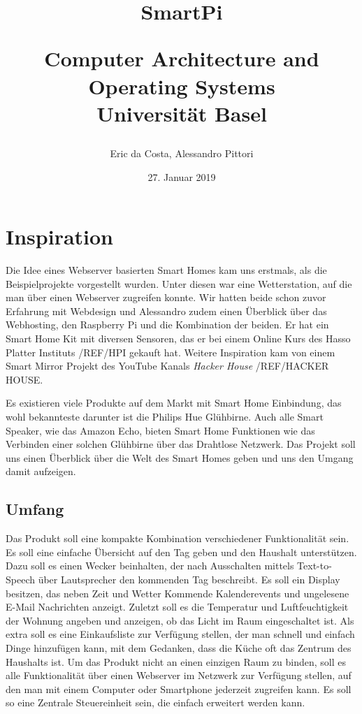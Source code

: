 \documentclass[11pt,a4paper]{article}
\title{SmartPi\\ \begin{large} Computer Architecture and Operating Systems\\ Universität Basel\end{large}}
\author{Eric da Costa, Alessandro Pittori}
\date{27. Januar 2019}
\begin{document}
\maketitle

\newpage

\section{Inspiration}
Die Idee eines Webserver basierten Smart Homes kam uns erstmals, als die Beispielprojekte vorgestellt wurden. Unter diesen war eine Wetterstation, auf die man über einen Webserver zugreifen konnte. Wir hatten beide schon zuvor Erfahrung mit Webdesign und Alessandro zudem einen Überblick über das Webhosting, den Raspberry Pi und die Kombination der beiden. Er hat ein Smart Home Kit mit diversen Sensoren, das er bei einem Online Kurs des Hasso Platter Instituts /REF/HPI gekauft hat. Weitere Inspiration kam von einem Smart Mirror Projekt des YouTube Kanals \textit{Hacker House} /REF/HACKER HOUSE.

Es existieren viele Produkte auf dem Markt mit Smart Home Einbindung, das wohl bekannteste darunter ist die Philips Hue Glühbirne. Auch alle Smart Speaker, wie das Amazon Echo, bieten Smart Home Funktionen wie das Verbinden einer solchen Glühbirne über das Drahtlose Netzwerk. Das Projekt soll uns einen Überblick über die Welt des Smart Homes geben und uns den Umgang damit aufzeigen.

\subsection{Umfang}
Das Produkt soll eine kompakte Kombination verschiedener Funktionalität sein. Es soll eine einfache Übersicht auf den Tag geben und den Haushalt unterstützen.
Dazu soll es einen Wecker beinhalten, der nach Ausschalten mittels Text-to-Speech über Lautsprecher den kommenden Tag beschreibt. Es soll ein Display besitzen, das neben Zeit und Wetter Kommende Kalenderevents und ungelesene E-Mail Nachrichten anzeigt. Zuletzt soll es die Temperatur und Luftfeuchtigkeit der Wohnung angeben und anzeigen, ob das Licht im Raum eingeschaltet ist. Als extra soll es eine Einkaufsliste zur Verfügung stellen, der man schnell und einfach Dinge hinzufügen kann, mit dem Gedanken, dass die Küche oft das Zentrum des Haushalts ist. Um das Produkt nicht an einen einzigen Raum zu binden, soll es alle Funktionalität über einen Webserver im Netzwerk zur Verfügung stellen, auf den man mit einem Computer oder Smartphone jederzeit zugreifen kann. Es soll so eine Zentrale Steuereinheit sein, die einfach erweitert werden kann.
\end{document}
